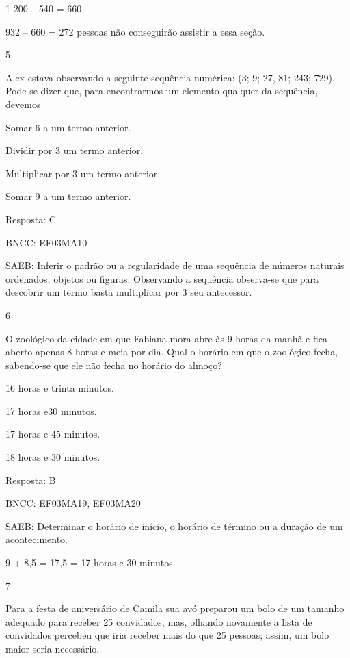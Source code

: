 \begin{escolha}
{\begin{escolha}
{1 200 -- 540 = 660

932 -- 660 = 272 pessoas não conseguirão assistir a essa seção.

\num{5}

Alex estava observando a seguinte sequência numérica: (3; 9; 27, 81; 243; 729).
Pode-se dizer que, para encontrarmos um elemento qualquer da sequência, devemos 

\begin{escolha}
\item
  Somar 6 a um termo anterior.
\item
  Dividir por 3 um termo anterior.
\item
  Multiplicar por 3 um termo anterior.
\item
  Somar 9 a um termo anterior.
\end{escolha}

Resposta: C

BNCC: EF03MA10

SAEB: Inferir o padrão ou a regularidade de uma sequência de
números naturais ordenados, objetos ou figuras.
Observando a sequência observa-se que para descobrir um termo basta
multiplicar por 3 seu antecessor.

\num{6}

O zoológico da cidade em que Fabiana mora abre às 9 horas da manhã e
fica aberto apenas 8 horas e meia por dia. Qual o horário em que o
zoológico fecha, sabendo-se que ele não fecha no horário do almoço?

\begin{escolha}
\item
  16 horas e trinta minutos.
\item
  17 horas e30 minutos.
\item
  17 horas e 45 minutos.
\item
  18 horas e 30 minutos.
\end{escolha}

Resposta: B

BNCC: EF03MA19, EF03MA20

SAEB: Determinar o horário de início, o horário de término ou
a duração de um acontecimento.

9 + 8,5 = 17,5 = 17 horas e 30 minutos

\num{7}

Para a festa de aniversário de Camila sua avó preparou um bolo de um
tamanho adequado para receber 25 convidados, mas, olhando novamente a
lista de convidados percebeu que iria receber mais do que 25 pessoas;
assim, um bolo maior seria necessário.

}
\end{escolha}}
\end{escolha}
